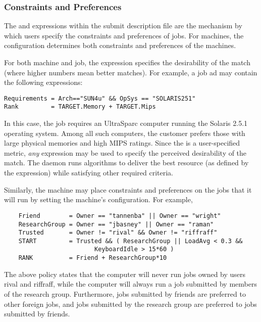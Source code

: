 \subsubsection{Constraints and Preferences}
The  and  expressions
within the submit description file
are the mechanism
by which users specify the constraints and preferences of jobs.
For machines, the configuration determines both 
constraints and preferences of the machines.

For both machine and job, 
the  expression specifies
the desirability of the match (where higher numbers mean better matches).
For example, a job ad may contain the following expressions:
\footnotesize
\begin{verbatim}
Requirements = Arch=="SUN4u" && OpSys == "SOLARIS251"
Rank         = TARGET.Memory + TARGET.Mips
\end{verbatim}
\normalsize
In this case, the job requires an UltraSparc computer running the Solaris 
2.5.1 operating system.
Among all such computers,
the customer prefers those with large physical memories and high MIPS ratings.  
Since the  is a user-specified metric,
\emph{any} expression may be used to specify the
perceived desirability of the match.
The  daemon runs algorithms
to deliver the best resource (as defined by the  expression)
while satisfying other required criteria.

Similarly, the machine may place constraints and preferences on 
the jobs that it will run by setting the machine's configuration.
For example,
\footnotesize
\begin{verbatim}
    Friend        = Owner == "tannenba" || Owner == "wright"
    ResearchGroup = Owner == "jbasney" || Owner == "raman"
    Trusted       = Owner != "rival" && Owner != "riffraff"
    START         = Trusted && ( ResearchGroup || LoadAvg < 0.3 &&
                         KeyboardIdle > 15*60 )
    RANK          = Friend + ResearchGroup*10
\end{verbatim}
\normalsize

The above policy states that the computer will never run jobs owned by
users rival and riffraff, while the computer will always run a 
job submitted by members of the research group.
Furthermore,
jobs submitted by friends are preferred to other foreign jobs,
and jobs submitted
by the research group are preferred to jobs submitted by friends. 

